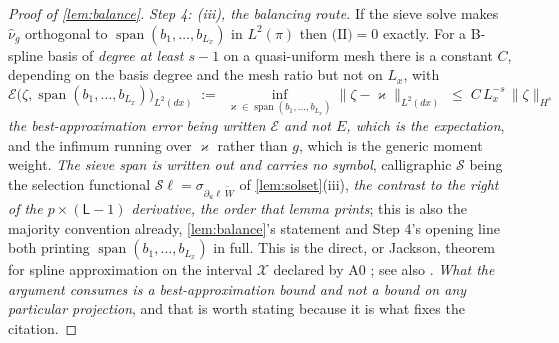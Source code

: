 \begin{proof}[Proof of \cref{lem:balance}]
\emph{Step 4: (iii), the balancing route.}
If the sieve solve makes $\hat\nu_g$ orthogonal to $\operatorname{span}(b_1,\dots,b_{L_x})$ in
$L^{2}(\pi)$ then $\text{(II)}=0$ exactly. For a B-spline basis of \emph{degree at least $s-1$} on a
quasi-uniform mesh there is a constant $C$, depending on the basis degree and the mesh ratio but not on
$L_x$, with
\begin{equation}\label{eq:jackson}
\mathcal E\big(\zeta,\operatorname{span}(b_1,\dots,b_{L_x})\big)_{L^{2}(dx)}
\;:=\;\inf_{\varkappa\in\operatorname{span}(b_1,\dots,b_{L_x})}\big\|\zeta-\varkappa\big\|_{L^{2}(dx)}
\;\le\;C\,L_x^{-s}\,\|\zeta\|_{H^{s}}
\end{equation}
\emph{the best-approximation error being written $\mathcal E$ and not $E$, which is the expectation}, and
the infimum running over $\varkappa$ rather than $g$, which is the generic moment weight.
\emph{The sieve span is written out and carries no symbol}, calligraphic $\mathcal S$ being the selection
functional $\mathcal S\ell=\sigma_{\partial_u\ell\,\widetilde W}$ of \cref{lem:solset}(iii), \emph{the
contrast to the right of the $p\times(\mathsf L-1)$ derivative, the order that lemma prints}; this is also
the majority convention already, \cref{lem:balance}'s statement and Step 4's opening line
both printing $\operatorname{span}(b_1,\dots,b_{L_x})$ in full. This is the
direct, or Jackson, theorem for spline approximation on the interval $\mathcal X$ declared by A0
\citep[Thm.~6.27]{schumaker2007}; see also \citet[Ch.~12]{devorelorentz1993}. \emph{What the argument
consumes is a best-approximation bound and not a bound on any particular projection}, and that is worth
stating because it is what fixes the citation.


\end{proof}
